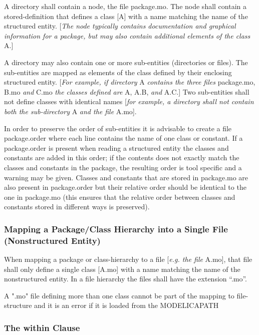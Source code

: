 \documentclass[../MLS.tex]{subfiles}
\begin{document}
A directory shall contain a node, the file package.mo. The node shall contain a stored-definition that defines a class {[}A{]} with a name
matching the name of the structured entity. {[}\emph{The node typically
contains documentation and graphical information for a package, but may
also contain additional elements of the class} A.{]}

A directory may also contain one or more sub-entities (directories or
files). The sub-entities are mapped as elements of the class defined by
their enclosing structured entity. {[}\emph{For example, if directory} A
\emph{contains the three files} package.mo, B.mo \emph{and} C.mo
\emph{the classes defined are} A, A.B, \emph{and} A.C.{]} Two
sub-entities shall not define classes with identical names {[}\emph{for
example, a directory shall not contain both the sub-directory} A
\emph{and the file} A.mo{]}.

In order to preserve the order of sub-entities it is advisable to create
a file package.order where each line contains the name of one class or
constant. If a package.order is present when reading a structured entity
the classes and constants are added in this order; if the contents does
not exactly match the classes and constants in the package, the
resulting order is tool specific and a warning may be given. Classes and
constants that are stored in package.mo are also present in
package.order but their relative order should be identical to the one in
package.mo (this ensures that the relative order between classes and
constants stored in different ways is preserved).

\subsubsection{Mapping a Package/Class Hierarchy into a Single File (Nonstructured Entity)}

When mapping a package or class-hierarchy to a file {[}\emph{e.g. the
  file} A.mo{]}, that file shall only define a single class {[}A.mo{]} with a
name matching the name of the nonstructured entity. In a file hierarchy
the files shall have the extension ``.mo''.

A ".mo" file defining more than one class cannot be part of the mapping
to file-structure and it is an error if it is loaded from the
MODELICAPATH

\subsubsection{The within Clause}
\end{document}
